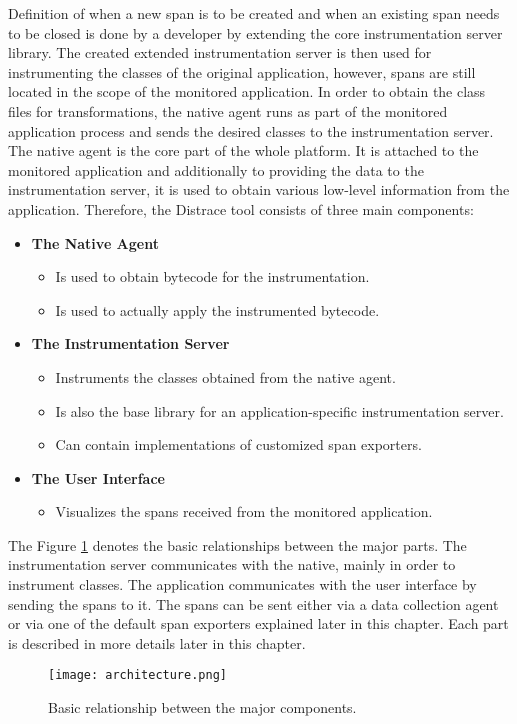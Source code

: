 Definition of when a new span is to be created and when an existing span needs to be closed is done by a developer by extending the core instrumentation server library. The created extended instrumentation server is then used for instrumenting the classes of the original application, however, spans are still located in the scope of the monitored application. In order to obtain the class files for transformations, the native agent runs as part of the monitored application process and sends the desired classes to the instrumentation server. The native agent is the core part of the whole platform. It is attached to the monitored application and additionally to providing the data to the instrumentation server, it is used to obtain various low-level information from the application. Therefore, the Distrace tool consists of three main components:
\begin{itemize}
	\item \textbf{The Native Agent}
	\begin{itemize}
		\item Is used to obtain bytecode for the instrumentation.
		\item Is used to actually apply the instrumented bytecode.
	\end{itemize}
	\item \textbf{The Instrumentation Server}
	\begin{itemize}
		\item Instruments the classes obtained from the native agent.
		\item Is also the base library for an application-specific instrumentation server.
		\item Can contain implementations of customized span exporters.
	\end{itemize}
	\item \textbf{The User Interface}
		\begin{itemize}
		\item Visualizes the spans received from the monitored application.
	\end{itemize}
\end{itemize}

The Figure \ref{fig:architecture} denotes the basic relationships between the major parts. The instrumentation server communicates with the native, mainly in order to instrument classes. The application communicates with the user interface by sending the spans to it. The spans can be sent either via a data collection agent or via one of the default span exporters explained later in this chapter. Each part is described in more details later in this chapter. \begin{figure}
	\centering
	\texttt{[image: architecture.png]}
	\caption{Basic relationship between the major components. }
	\label{fig:architecture}
\end{figure}

